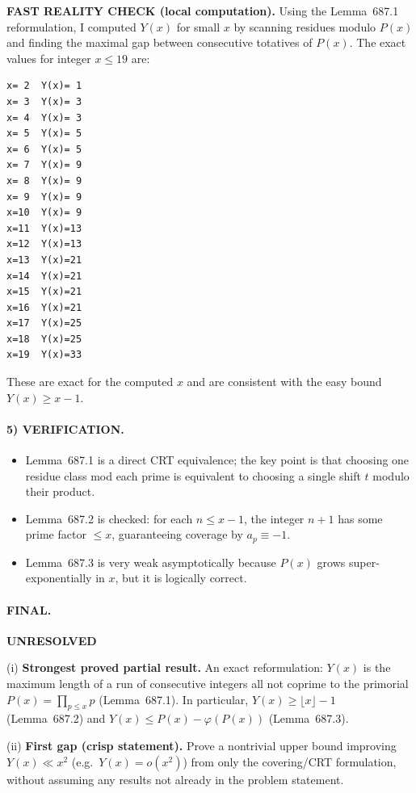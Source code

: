 \medskip
\noindent\textbf{FAST REALITY CHECK (local computation).}
Using the Lemma~687.1 reformulation, I computed $Y(x)$ for small $x$ by scanning residues modulo $P(x)$ and finding the maximal gap between
consecutive totatives of $P(x)$. The exact values for integer $x\le 19$ are:
\begin{verbatim}
x= 2  Y(x)= 1
x= 3  Y(x)= 3
x= 4  Y(x)= 3
x= 5  Y(x)= 5
x= 6  Y(x)= 5
x= 7  Y(x)= 9
x= 8  Y(x)= 9
x= 9  Y(x)= 9
x=10  Y(x)= 9
x=11  Y(x)=13
x=12  Y(x)=13
x=13  Y(x)=21
x=14  Y(x)=21
x=15  Y(x)=21
x=16  Y(x)=21
x=17  Y(x)=25
x=18  Y(x)=25
x=19  Y(x)=33
\end{verbatim}
These are exact for the computed $x$ and are consistent with the easy bound $Y(x)\ge x-1$.

\paragraph{5) VERIFICATION.}
\begin{itemize}
\item Lemma~687.1 is a direct CRT equivalence; the key point is that choosing one residue class mod each prime is equivalent to choosing
a single shift $t$ modulo their product.
\item Lemma~687.2 is checked: for each $n\le x-1$, the integer $n+1$ has some prime factor $\le x$, guaranteeing coverage by $a_p\equiv -1$.
\item Lemma~687.3 is very weak asymptotically because $P(x)$ grows super-exponentially in $x$, but it is logically correct.
\end{itemize}

\paragraph{FINAL.}
\noindent\textbf{UNRESOLVED}

\smallskip
\noindent(i) \textbf{Strongest proved partial result.}
An exact reformulation: $Y(x)$ is the maximum length of a run of consecutive integers all not coprime to the primorial
$P(x)=\prod_{p\le x}p$ (Lemma~687.1). In particular, $Y(x)\ge \lfloor x\rfloor-1$ (Lemma~687.2) and
$Y(x)\le P(x)-\varphi(P(x))$ (Lemma~687.3).

\smallskip
\noindent(ii) \textbf{First gap (crisp statement).}
Prove a nontrivial upper bound improving $Y(x)\ll x^2$ (e.g.\ $Y(x)=o(x^2)$) from only the covering/CRT formulation, without assuming
any results not already in the problem statement.

